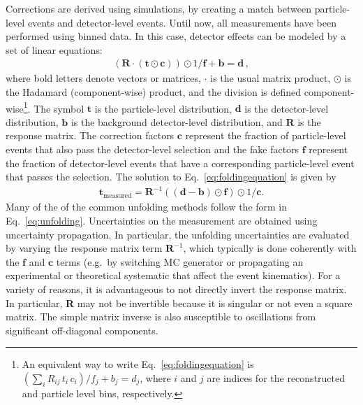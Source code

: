 Corrections are derived using simulations, by creating a match between particle-level events and detector-level events.  Until now, all measurements have been performed using binned data.   In this case, detector effects can be modeled by a set of linear equations:
\begin{align}
\label{eq:foldingequation}
\left(\textbf{R}\cdot (\textbf{t}\odot \textbf{c})\right)\odot 1/\textbf{f}+\textbf{b}=\textbf{d}\,,
\end{align}
where bold letters denote vectors or matrices, $\cdot$ is the usual matrix product, $\odot$ is the Hadamard (component-wise) product, and the division is defined component-wise\footnote{An equivalent way to write Eq.~\ref{eq:foldingequation} is $\left(\sum_{i}R_{ij}\,t_i\,c_i\right)/f_j+b_j=d_j$, where $i$ and $j$ are indices for the reconstructed and particle level bins, respectively.}. The symbol $\textbf{t}$ is the particle-level distribution, $\textbf{d}$ is the detector-level distribution, $\textbf{b}$ is the background detector-level distribution, and $\textbf{R}$ is the response matrix.  The correction factors $\textbf{c}$ represent the fraction of particle-level events that also pass the detector-level selection and the fake factors $\textbf{f}$ represent the fraction of detector-level events that have a corresponding particle-level event that passes the selection.  The solution to Eq.~\ref{eq:foldingequation} is given by
\begin{align}
\label{eq:unfolding}
\textbf{t}_\text{measured} = \textbf{R}^{-1}\left( (\textbf{d}-\textbf{b})\odot \textbf{f}\right)\odot 1/\textbf{c}.
\end{align}
Many of the of the common unfolding methods follow the form in Eq.~\ref{eq:unfolding}. 
Uncertainties on the measurement are obtained using uncertainty propagation. In particular, the unfolding uncertainties are evaluated by varying the response matrix term $\mathbf{R}^{-1}$, which typically is done coherently with the $\mathbf{f}$ and $\mathbf{c}$ terms (e.g.\ by switching MC generator or propagating an experimental or theoretical systematic that affect the event kinematics).
For a variety of reasons, it is advantageous to not directly invert the response matrix.  In particular, \textbf{R} may not be invertible because it is singular or not even a square matrix.  The simple matrix inverse is also susceptible to oscillations from significant off-diagonal components.


